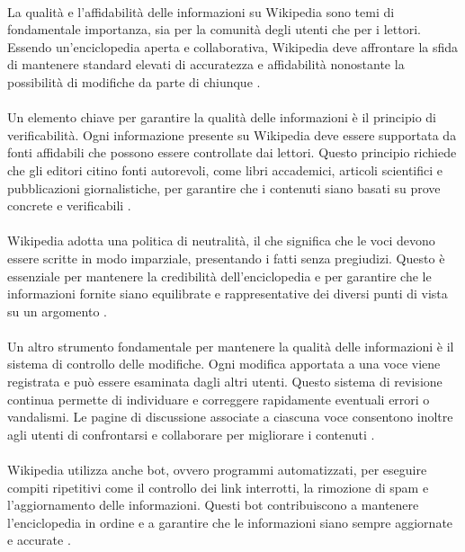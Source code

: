 \documentclass[12pt,a4paper]{report}
\begin{document}
\paragraph*{}
La qualità e l'affidabilità delle informazioni su Wikipedia sono temi di fondamentale importanza, sia per la comunità degli utenti che per i lettori. Essendo un'enciclopedia aperta e collaborativa, Wikipedia deve affrontare la sfida di mantenere standard elevati di accuratezza e affidabilità nonostante la possibilità di modifiche da parte di chiunque \cite{reagle2010good}.

\paragraph*{}
Un elemento chiave per garantire la qualità delle informazioni è il principio di verificabilità. Ogni informazione presente su Wikipedia deve essere supportata da fonti affidabili che possono essere controllate dai lettori. Questo principio richiede che gli editori citino fonti autorevoli, come libri accademici, articoli scientifici e pubblicazioni giornalistiche, per garantire che i contenuti siano basati su prove concrete e verificabili \cite{denning2005wikipedia}.

\paragraph*{}
Wikipedia adotta una politica di neutralità, il che significa che le voci devono essere scritte in modo imparziale, presentando i fatti senza pregiudizi. Questo è essenziale per mantenere la credibilità dell'enciclopedia e per garantire che le informazioni fornite siano equilibrate e rappresentative dei diversi punti di vista su un argomento \cite{reagle2010good}.

\paragraph*{}
Un altro strumento fondamentale per mantenere la qualità delle informazioni è il sistema di controllo delle modifiche. Ogni modifica apportata a una voce viene registrata e può essere esaminata dagli altri utenti. Questo sistema di revisione continua permette di individuare e correggere rapidamente eventuali errori o vandalismi. Le pagine di discussione associate a ciascuna voce consentono inoltre agli utenti di confrontarsi e collaborare per migliorare i contenuti \cite{jemielniak2014wikipedia}.

\paragraph*{}
Wikipedia utilizza anche bot, ovvero programmi automatizzati, per eseguire compiti ripetitivi come il controllo dei link interrotti, la rimozione di spam e l'aggiornamento delle informazioni. Questi bot contribuiscono a mantenere l'enciclopedia in ordine e a garantire che le informazioni siano sempre aggiornate e accurate \cite{history_of_wikis}.
\end{document}
